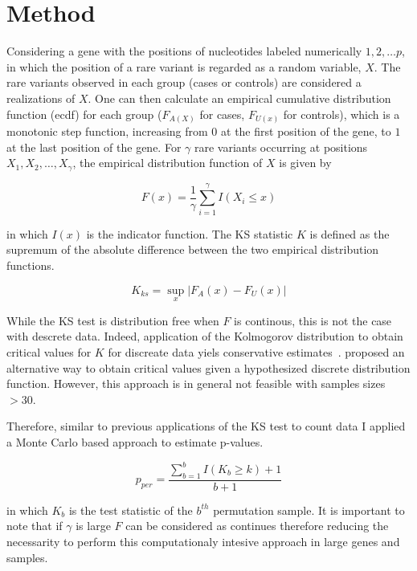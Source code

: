 \section{Method}
\label{sec:method}

Considering a gene with the positions of nucleotides labeled numerically $1, 2, \ldots p$, in which the position of a rare variant is regarded as a random variable, $X$.
The rare variants observed in each group (cases or controls) are considered a realizations of $X$.
One can then calculate an empirical cumulative distribution function (ecdf) for each group ($F_{A(X)}$ for cases, $F_{U(x)}$ for controls), which is a monotonic step function, increasing from $0$ at the first position of the gene, to $1$ at the last position of the gene.
For $\gamma$ rare variants occurring at positions $X_1, X_2, \ldots, X_\gamma$, the empirical distribution function of $X$ is given by

\begin{equation}
  F(x) = \frac{1}{\gamma}\sum^\gamma_{i=1}I(X_i \leq x)
\end{equation}

in which $I(x)$ is the indicator function.
The KS statistic $K$ is defined as the supremum of the absolute difference between the two empirical distribution functions.

\begin{equation}
	K_{ks} = \sup_x | F_A(x) - F_U(x) |
\end{equation}

While the KS test is distribution free when $F$ is continous, this is not the case with descrete data.
Indeed, application of the Kolmogorov distribution to obtain critical values for $K$ for discreate data yiels conservative estimates~\cite{Walsh1963,Conover1972}. 
\citet{Conover1972} proposed an alternative way to obtain critical values given a hypothesized discrete distribution function.
However, this approach is in general not feasible with samples sizes $>30$.

Therefore, similar to previous applications of the KS test to count data I applied a Monte Carlo based approach to estimate p-values. 

\begin{equation}
  p_{per} = \frac{\sum^b_{b=1} I(K_b \geq k)+1}{b+1}
\end{equation}

in which $K_b$ is the test statistic of the $b^{th}$ permutation sample.
It is important to note that if $\gamma$ is large $F$ can be considered as continues therefore reducing the necessarity to perform this computationaly intesive approach in large genes and samples. 

